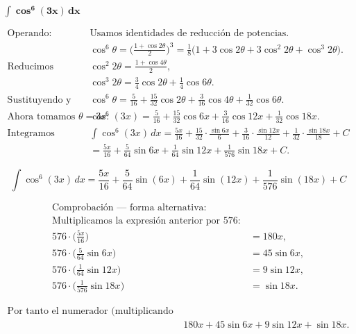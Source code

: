 $\displaystyle \mathbf{\int \cos^{6}\!\left(3x\right)\,dx}$

\nopagebreak
$$
\begin{aligned}
\text{Operando: } &
\text{Usamos identidades de reducción de potencias.} \\[6pt]
&\cos^{6}\theta = \Big(\tfrac{1+\cos 2\theta}{2}\Big)^{3}
= \tfrac{1}{8}\big(1+3\cos 2\theta +3\cos^{2}2\theta +\cos^{3}2\theta\big). \\[6pt]
\text{Reducimos potencias: } &
\cos^{2}2\theta = \tfrac{1+\cos 4\theta}{2}, \\[4pt]
&\cos^{3}2\theta = \tfrac{3}{4}\cos 2\theta + \tfrac{1}{4}\cos 6\theta. \\[6pt]
\text{Sustituyendo y simplificando: } &
\cos^{6}\theta
= \tfrac{5}{16} + \tfrac{15}{32}\cos 2\theta + \tfrac{3}{16}\cos 4\theta + \tfrac{1}{32}\cos 6\theta. \\[8pt]
\text{Ahora tomamos } \theta=3x: &
\cos^{6}(3x)
= \tfrac{5}{16} + \tfrac{15}{32}\cos 6x + \tfrac{3}{16}\cos 12x + \tfrac{1}{32}\cos 18x. \\[8pt]
\text{Integramos término a término: } &
\int \cos^{6}(3x)\,dx
= \tfrac{5x}{16}
+ \tfrac{15}{32}\cdot\tfrac{\sin 6x}{6}
+ \tfrac{3}{16}\cdot\tfrac{\sin 12x}{12}
+ \tfrac{1}{32}\cdot\tfrac{\sin 18x}{18} + C \\[6pt]
&= \tfrac{5x}{16}
+ \tfrac{5}{64}\sin 6x
+ \tfrac{1}{64}\sin 12x
+ \tfrac{1}{576}\sin 18x + C.
\end{aligned}
$$

$$
\boxed{\displaystyle 
\int \cos^{6}\!\left(3x\right)\,dx
= \frac{5x}{16}
+ \frac{5}{64}\sin\!\left(6x\right)
+ \frac{1}{64}\sin\!\left(12x\right)
+ \frac{1}{576}\sin\!\left(18x\right) + C}
$$

\nopagebreak
$$
\begin{aligned}
\text{Comprobación — forma alternativa: } &\\[6pt]
\text{Multiplicamos la expresión anterior por }576: &\\[4pt]
576\cdot\Big(\tfrac{5x}{16}\Big) &= 180x, \\[2pt]
576\cdot\Big(\tfrac{5}{64}\sin 6x\Big) &= 45\sin 6x, \\[2pt]
576\cdot\Big(\tfrac{1}{64}\sin 12x\Big) &= 9\sin 12x, \\[2pt]
576\cdot\Big(\tfrac{1}{576}\sin 18x\Big) &= \sin 18x.
\end{aligned}
$$

$$
\begin{aligned}
\text{Por tanto el numerador (multiplicando por 576) es } &\\[4pt]
&180x + 45\sin 6x + 9\sin 12x + \sin 18x.
\end{aligned}
$$

